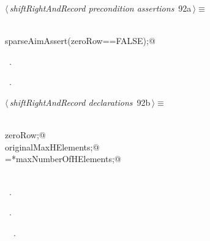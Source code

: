 \documentclass{article}
\begin{document}
\begin{flushleft} \small
\begin{minipage}{\linewidth}\label{scrap169}\raggedright\small
{} $\langle\,${\itshape shiftRightAndRecord precondition assertions}\nobreak\ {\footnotesize {92a}}$\,\rangle\equiv$
\vspace{-1ex}
\begin{list}{}{} \item
\mbox{}\verb@@\\
\mbox{}\verb@    sparseAimAssert(zeroRow==FALSE);@\\
\mbox{}\verb@@{\NWsep}
\end{list}
\vspace{-1.5ex}
\footnotesize
\begin{list}{}{\setlength{\itemsep}{-\parsep}\setlength{\itemindent}{-\leftmargin}}
\item \NWtxtMacroDefBy\ .
\item \NWtxtMacroRefIn\ .

\item{}
\end{list}
\end{minipage}\vspace{4ex}
\end{flushleft}
\begin{flushleft} \small
\begin{minipage}{\linewidth}\label{scrap170}\raggedright\small
{} $\langle\,${\itshape shiftRightAndRecord declarations}\nobreak\ {\footnotesize {92b}}$\,\rangle\equiv$
\vspace{-1ex}
\begin{list}{}{} \item
\mbox{}\verb@@\\
\mbox{}\verb@int zeroRow;@\\
\mbox{}\verb@int originalMaxHElements;@\\
\mbox{}\verb@originalMaxHElements=*maxNumberOfHElements;@\\
\mbox{}\verb@@\\
\mbox{}\verb@@{\NWsep}
\end{list}
\vspace{-1.5ex}
\footnotesize
\begin{list}{}{\setlength{\itemsep}{-\parsep}\setlength{\itemindent}{-\leftmargin}}
\item \NWtxtMacroDefBy\ .
\item \NWtxtMacroRefIn\ .
\item \NWtxtIdentsUsed\nobreak\  \verb@maxNumberOfHElements@\nobreak\ .
\item{}
\end{list}
\end{minipage}\vspace{4ex}
\end{flushleft}
\end{document}
